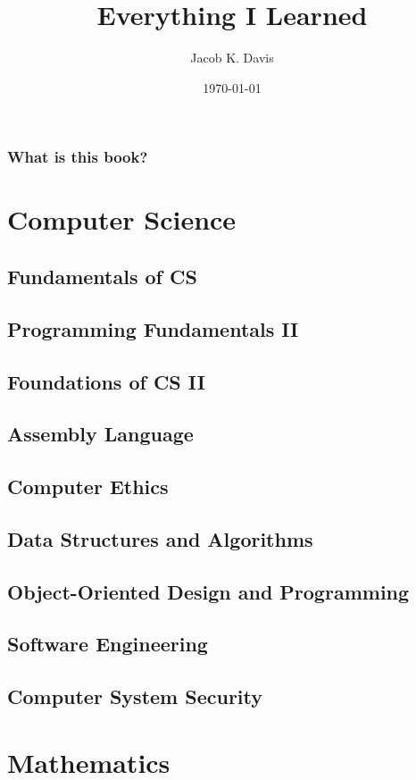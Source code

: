 \documentclass[11pt]{book}
\begin{document}
\title{Everything I Learned}
\author{Jacob K. Davis}
\date{\today}
\maketitle

\section{What is this book?}

\tableofcontents


\part{Computer Science}
\chapter{Fundamentals of CS}
\chapter{Programming Fundamentals II}
\chapter{Foundations of CS II}
\chapter{Assembly Language}
\chapter{Computer Ethics}
\chapter{Data Structures and Algorithms}
\chapter{Object-Oriented Design and Programming}
\chapter{Software Engineering}
\chapter{Computer System Security}


\part{Mathematics}
\end{document}
